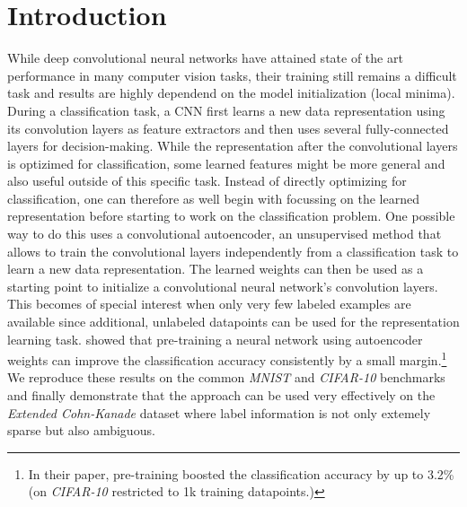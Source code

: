 \documentclass{article}
\begin{document}
\section{Introduction}
  While deep convolutional neural networks have attained state of the art performance in many computer vision tasks, their training still remains a difficult task and results are highly dependend on the model initialization (local minima). 
  During a classification task, a CNN first learns a new data representation using its convolution layers as feature extractors and then uses several fully-connected layers for decision-making. 
  While the representation after the convolutional layers is optizimed for classification, some learned features might be more general and also useful outside of this specific task. 
  Instead of directly optimizing for classification, one can therefore as well begin with focussing on the learned representation before starting to work on the classification problem.
  One possible way to do this uses a convolutional autoencoder, an unsupervised method that allows to train the convolutional layers independently from a classification task to learn a new data representation. 
  The learned weights can then be used as a starting point to initialize a convolutional neural network's convolution layers. 
  This becomes of special interest when only very few labeled examples are available since additional, unlabeled datapoints can be used for the representation learning task. 
  \citep{masci2011stacked} showed that pre-training a neural network using autoencoder weights can improve the classification accuracy consistently by a small margin.\footnote{In their paper, pre-training boosted the classification accuracy by up to 3.2\% (on \emph{CIFAR-10} restricted to 1k training datapoints.)}
  We reproduce these results on the common \emph{MNIST} \citep{lecun1998mnist} and \emph{CIFAR-10} \citep{krizhevsky2009learning} benchmarks and finally demonstrate that the approach can be used very effectively on the \emph{Extended Cohn-Kanade} \citep{kanade2000comprehensive,lucey2010extended} dataset where label information is not only extemely sparse but also ambiguous. 
\end{document}
